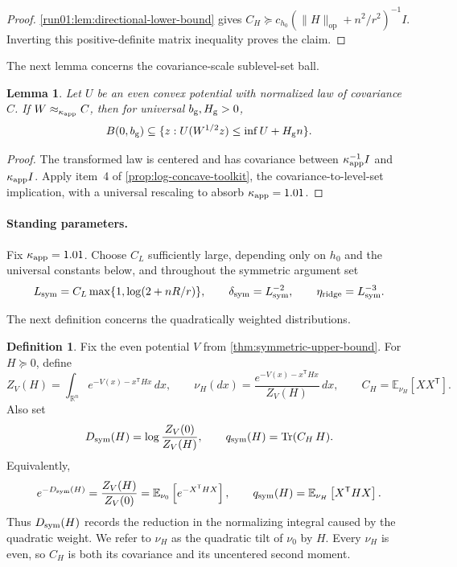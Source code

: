\documentclass[11pt]{article}
\numberwithin{equation}{section}
\newtheorem{lemma}{Lemma}[section]
\theoremstyle{definition}
\newtheorem{definition}[definition]{Definition}
\newcommand{\E}[2]{\mathbb{E}_{#1}\left[#2\right]}
\begin{document}
\begin{proof}
\cref{run01:lem:directional-lower-bound} gives
$C_H\succeq c_{h_0}(\|H\|_{\mathrm{op}}+n^2/r^2)^{-1}I$.
Inverting this positive-definite matrix inequality proves the claim.
\end{proof}

The next lemma concerns the covariance-scale sublevel-set ball.

\begin{lemma}
\label{run01:lem:covariance-ground-ball}
Let $U$ be an even convex potential with normalized law of covariance
$C$.
If $W\approx_{\kappa_{\rm app}}C$, then for universal
$b_{\rm g},H_{\rm g}>0$,
\[
 B(0,b_{\rm g})
 \subseteq
 \{z:U(W^{1/2}z)\leq\inf U+H_{\rm g}n\}.
\]
\end{lemma}

\begin{proof}
The transformed law is centered and has covariance between
$\kappa_{\rm app}^{-1}I$ and
$\kappa_{\rm app}I$.
Apply item~4 of \cref{prop:log-concave-toolkit}, the covariance-to-level-set
implication, with a universal rescaling to absorb $\kappa_{\rm app}=1.01$.
\end{proof}
\space
\paragraph{Standing parameters.}
Fix $\kappa_{\rm app}=1.01$.
Choose $C_L$ sufficiently large, depending only on
$h_0$ and the universal constants below, and throughout the symmetric argument
set
\[
L_{\rm sym}=C_L\max\{1,\log(2+nR/r)\},
\qquad
\delta_{\rm sym}=L_{\rm sym}^{-2},
\qquad
\eta_{\rm ridge}=L_{\rm sym}^{-3}.
\]

The next definition concerns the quadratically weighted distributions.

\begin{definition}
\label{run01:def:quadratic-target}
Fix the even potential $V$ from \cref{thm:symmetric-upper-bound}.
For $H\succeq0$, define
\[
Z_V(H)=\int_{\mathbb R^n}e^{-V(x)-x^{\mathsf T} Hx}\,dx,
\qquad
\nu_H(dx)=\frac{e^{-V(x)-x^{\mathsf T} Hx}}{Z_V(H)}\,dx,
\qquad
C_H=\E{\nu_H}{XX^{\mathsf T}}.
\]
Also set
\[
D_{\rm sym}(H)=\log\frac{Z_V(0)}{Z_V(H)},
\qquad
q_{\rm sym}(H)=\operatorname{Tr}(C_H\,H).
\]
Equivalently,
\[
e^{-D_{\rm sym}(H)}
=\frac{Z_V(H)}{Z_V(0)}
=\E{\nu_0}{e^{-X^{\mathsf T}H X}},
\qquad
q_{\rm sym}(H)=\E{\nu_H}{X^{\mathsf T}H X}.
\]
Thus $D_{\rm sym}(H)$ records the reduction in the normalizing integral caused
by the quadratic weight.
We refer to $\nu_H$ as the quadratic tilt of
$\nu_0$ by
$H$.
Every $\nu_H$ is even, so
$C_H$ is both its covariance and its uncentered second moment.
\end{definition}
\end{document}
